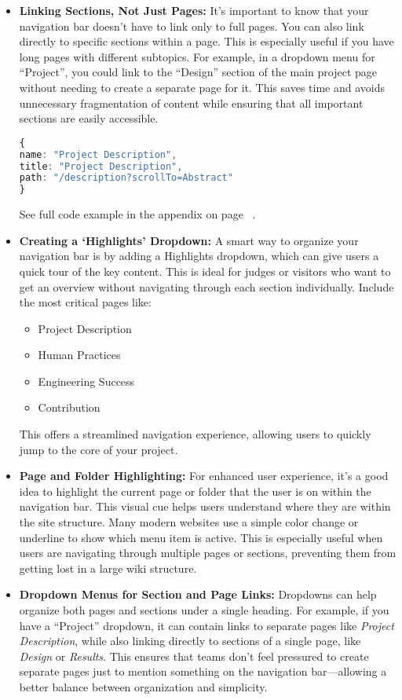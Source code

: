 \begin{itemize}
    \item \textbf{Linking Sections, Not Just Pages:}
    It’s important to know that your navigation bar doesn’t have to link only to full pages.
    You can also link directly to specific sections within a page.
    This is especially useful if you have long pages with different subtopics.
    For example, in a dropdown menu for ``Project'', you could link to the ``Design'' section of the main project page without needing to create a separate page for it.
    This saves time and avoids unnecessary fragmentation of content while ensuring that all important sections are easily accessible.
    \begin{mybox}
        \begin{lstlisting}[language=TypeScript]
{
name: "Project Description",
title: "Project Description",
path: "/description?scrollTo=Abstract"
}
        \end{lstlisting}
    \end{mybox}
    See full code example in the appendix on page \ \pageref{lis:pagests}.
    \item \textbf{Creating a ‘Highlights’ Dropdown:}
    A smart way to organize your navigation bar is by adding a Highlights dropdown, which can give users a quick tour of the key content.
    This is ideal for judges or visitors who want to get an overview without navigating through each section individually.
    Include the most critical pages like:
    \begin{itemize}
        \item Project Description
        \item Human Practices
        \item Engineering Success
        \item Contribution
    \end{itemize}
    This offers a streamlined navigation experience, allowing users to quickly jump to the core of your project.

    \item \textbf{Page and Folder Highlighting:}
    For enhanced user experience, it’s a good idea to highlight the current page or folder that the user is on within the navigation bar.
    This visual cue helps users understand where they are within the site structure.
    Many modern websites use a simple color change or underline to show which menu item is active.
    This is especially useful when users are navigating through multiple pages or sections, preventing them from getting lost in a large wiki structure.

    \item \textbf{Dropdown Menus for Section and Page Links:}
    Dropdowns can help organize both pages and sections under a single heading.
    For example, if you have a ``Project'' dropdown, it can contain links to separate pages like \textit{Project Description}, while also linking directly to sections of a single page, like \textit{Design} or \textit{Results}.
    This ensures that teams don’t feel pressured to create separate pages just to mention something on the navigation bar—allowing a better balance between organization and simplicity.

\end{itemize}
